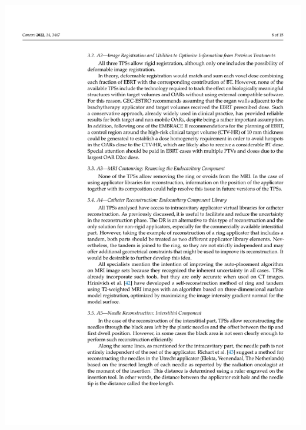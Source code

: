 \documentclass[
  a4paper,
]{scrreprt}
\begin{document}
\includegraphics{articulos/cancers/cancers-08.png}
\end{document}
